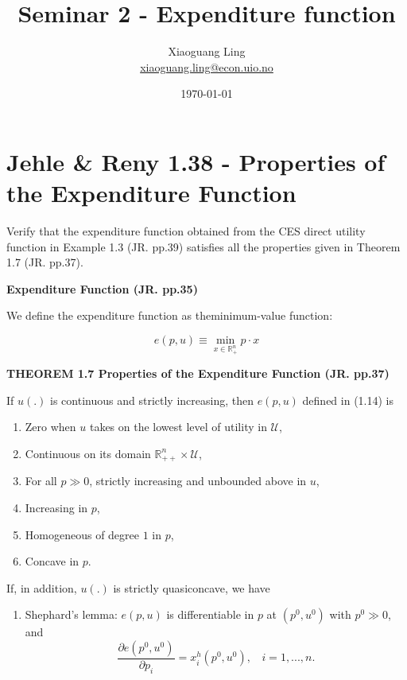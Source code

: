 \documentclass{article}
\title{Seminar 2 - Expenditure function}
\author{Xiaoguang Ling \\  \href{xiaoguang.ling@econ.uio.no}{xiaoguang.ling@econ.uio.no}}
\date{\today}
\newcommand{\R}{\mathbb{R}}
\begin{document}
\maketitle

\section{Jehle \& Reny 1.38 - Properties of the Expenditure Function}
Verify that the expenditure function obtained from the CES direct utility function in Example 1.3 
(JR. pp.39) satisfies all the properties given in Theorem 1.7 (JR. pp.37).

\begin{mdframed}[backgroundcolor=blue!20,linecolor=white]

\textbf{Expenditure Function (JR. pp.35)}

We define the expenditure function as theminimum-value function:

$$e(p, u) \equiv \min_{x \in \R^n_+} p \cdot x$$

\textbf{THEOREM 1.7 Properties of the Expenditure Function (JR. pp.37)}

\bigskip

If $u(.)$ is continuous and strictly increasing, then $e(p, u)$ defined in (1.14) is

\begin{enumerate}
\item Zero when $u$ takes on the lowest level of utility in $\mathcal{U}$,
\item Continuous on its domain $\R^n_{++} \times \mathcal{U}$,
\item For all $p \gg 0$, strictly increasing and unbounded above in $u$,
\item Increasing in $p$,
\item Homogeneous of degree $1$ in $p$,
\item Concave in $p$.
\end{enumerate}
If, in addition, $u(.)$ is strictly quasiconcave, we have
\begin{enumerate}[start = 7]
\item Shephard’s lemma: $e(p, u)$ is differentiable in $p$ at $(p^0, u^0)$ with $p^0 \gg 0$, and
$$\frac{\partial e(p^0, u^0)}{\partial p_i} = x^h_i (p^0, u^0), \ \ \ \ i = 1, . . . , n.$$
\end{enumerate}
\end{mdframed}
\end{document}
